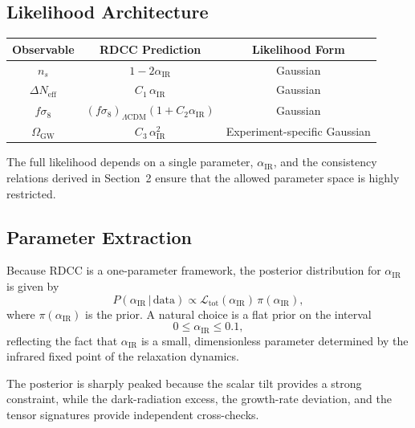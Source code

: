 \documentclass[11pt,a4paper]{article}
\begin{document}
\subsection{Likelihood Architecture}

\begin{center}
\begin{tabular}{|c|c|c|}
\hline
\textbf{Observable} & \textbf{RDCC Prediction} & \textbf{Likelihood Form} \\
\hline
$n_s$ & $1 - 2\alpha_{\mathrm{IR}}$ & Gaussian \\
\hline
$\Delta N_{\mathrm{eff}}$ & $C_1\,\alpha_{\mathrm{IR}}$ & Gaussian \\
\hline
$f\sigma_8$ & $(f\sigma_8)_{\Lambda\mathrm{CDM}}(1 + C_2\alpha_{\mathrm{IR}})$ & Gaussian \\
\hline
$\Omega_{\mathrm{GW}}$ & $C_3\,\alpha_{\mathrm{IR}}^2$ & Experiment-specific Gaussian \\
\hline
\end{tabular}
\end{center}

The full likelihood depends on a single parameter, $\alpha_{\mathrm{IR}}$, and the consistency
relations derived in Section~2 ensure that the allowed parameter space is highly restricted.

\subsection{Parameter Extraction}

Because RDCC is a one-parameter framework, the posterior distribution for $\alpha_{\mathrm{IR}}$ is
given by
\begin{equation}
    P(\alpha_{\mathrm{IR}}\,|\,\mathrm{data})
    \propto
    \mathcal{L}_{\mathrm{tot}}(\alpha_{\mathrm{IR}})\,\pi(\alpha_{\mathrm{IR}}),
\end{equation}
where $\pi(\alpha_{\mathrm{IR}})$ is the prior. A natural choice is a flat prior on the interval
\begin{equation}
    0 \leq \alpha_{\mathrm{IR}} \leq 0.1,
\end{equation}
reflecting the fact that $\alpha_{\mathrm{IR}}$ is a small, dimensionless parameter determined by the
infrared fixed point of the relaxation dynamics.

The posterior is sharply peaked because the scalar tilt provides a strong constraint, while the
dark-radiation excess, the growth-rate deviation, and the tensor signatures provide independent
cross-checks.
\end{document}
